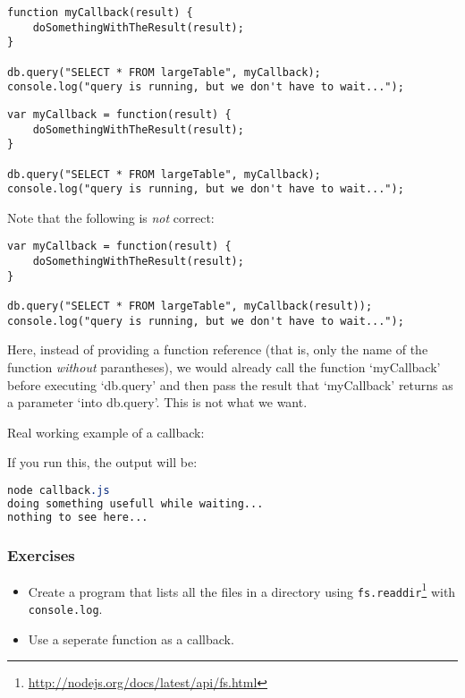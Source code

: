 \documentclass[a4paper]{report}
\begin{document}
\begin{lstlisting} 
function myCallback(result) { 
	doSomethingWithTheResult(result); 
} 
 
db.query("SELECT * FROM largeTable", myCallback); 
console.log("query is running, but we don't have to wait..."); 
\end{lstlisting} 
 
\begin{lstlisting} 
var myCallback = function(result) { 
	doSomethingWithTheResult(result); 
} 
 
db.query("SELECT * FROM largeTable", myCallback); 
console.log("query is running, but we don't have to wait..."); 
\end{lstlisting} 
 
\noindent Note that the following is \emph{not} correct: 
 
\begin{lstlisting} 
var myCallback = function(result) { 
	doSomethingWithTheResult(result); 
} 
 
db.query("SELECT * FROM largeTable", myCallback(result));
console.log("query is running, but we don't have to wait..."); 
\end{lstlisting} 
 
\noindent Here, instead of providing a function reference (that is, only the name of the function \emph{without} parantheses), we would already call the function `myCallback' before executing `db.query' and then pass the result that `myCallback' returns as a parameter `into db.query'. This is not what we want. 
 
\noindent Real working example of a callback: 
 
If you run this, the output will be: 
\begin{lstlisting}[language=css] 
node callback.js
doing something usefull while waiting... 
nothing to see here... 
\end{lstlisting} 
 
\subsubsection*{Exercises} 
\begin{itemize} 
	\item Create a program that lists all the files in a directory using \texttt{fs.readdir}\footnote{\url{http://nodejs.org/docs/latest/api/fs.html}} with \texttt{console.log}. 
	\item Use a seperate function as a callback. 
\end{itemize} 
 
\end{document}
